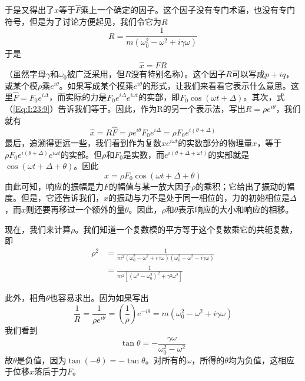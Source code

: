 于是又得出了$\hat{x}$等于$\hat{F}$乘上一个确定的因子。这个因子没有专门术语，也没有专门符号，但是为了讨论方便起见，我们令它为$R$
\begin{equation*}
    R = \frac{1}{m(\omega_0^2 - \omega^2 + i\gamma\omega)}
\end{equation*}
于是
\begin{equation}
    \label{Eq:I:23:9}
    \hat{x} = \hat{F}R
\end{equation}
（虽然字母$\gamma$和$\omega_0$被广泛采用，但$R$没有特别名称）。这个因子$R$可以写成$p+iq$，或某个模$\rho$乘$e^{i\theta}$。如果写成某个模乘$e^{i\theta}$的形式，让我们来看看它表示什么意思。这里$\hat{F}=F_0e^{i\Delta}$，而实际的力是$F_0e^{i\Delta}e^{i\omega t}$的实部，即$F_0\cos(\omega t+\Delta)$。其次，式（\ref{Eq:I:23:9}）告诉我们等于。因此，作为R的另一个表示法，写出$R=\rho e^{i\theta}$，我们就有
\begin{equation*}
    \hat{x} = R\hat{F} = \rho e^{i\theta}F_0e^{i\Delta} = \rho F_0e^{i(\theta + \Delta)}
\end{equation*}
最后，追溯得更远一些，我们看到作为复数$\hat{x}e^{i\omega t}$的实数部分的物理量$x$，等于$\rho F_0e^{i(\theta+\Delta)}e^{i\omega t}$的实部。但$\rho$和$F_0$是实数，而$e^{i(\theta+\Delta+\omega t)}$的实部就是$\cos(\omega t+\Delta+\theta)$。因此
\begin{equation}
    \label{Eq:I:23:10}
    x=\rho F_0 \cos(\omega t + \Delta + \theta)
\end{equation}
由此可知，响应的振幅是力$F$的幅值与某一放大因子$\rho$的乘积；它给出了振动的幅度。但是，它还告诉我们，$x$的振动与力不是处于同一相位的，力的初始相位是$\Delta$，而$x$则还要再移过一个额外的量$\theta$。因此，$\rho$和$\theta$表示响应的大小和响应的相移。

现在，我们来计算$\rho$。我们知道一个复数模的平方等于这个复数乘它的共轭复数，即
\begin{equation}
    \label{Eq:I:23:11}
    \begin{aligned}
        \rho^2 &= \frac{1}{m^2(\omega_0^2 - \omega^2 + i\gamma\omega)(\omega_0^2 - \omega^2 - i\gamma\omega)} \\
        &= \frac{1}{m^2[(\omega^2-\omega_0^2)^2 + \gamma^2\omega^2]}
    \end{aligned}
\end{equation}

此外，相角$\theta$也容易求出。因为如果写出
\begin{equation*}
    \frac{1}{R} = \frac{1}{\rho e^{i\theta}} = \left ( \frac{1}{\rho} \right ) e^{-i\theta} = m(\omega_0^2 - \omega^2 + i\gamma\omega)
\end{equation*}
我们看到
\begin{equation}
    \label{Eq:I:23:12}
    \tan \theta = -\frac{\gamma\omega}{\omega_0^2 - \omega^2}
\end{equation}
故$\theta$是负值，因为$\tan(-\theta)=-\tan\theta$。对所有的$\omega$，所得的$\theta$均为负值，这相应于位移$x$落后于力$F$。

